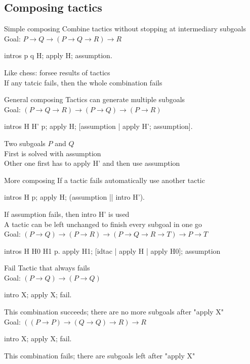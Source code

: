 \subsection{Composing tactics}
\begin{frame}[fragile]{Simple composing}
	Combine tactics without stopping at intermediary subgoals\\
	\pause
	\medskip
	Goal: $P \rightarrow Q \rightarrow (P \rightarrow Q \rightarrow R) \rightarrow R$
	\pause
	\begin{user}
		intros p q H; apply H; assumption.
	\end{user}
	\pause
	Like chess: forsee results of tactics\\
	\pause
	\medskip
	If any tatcic fails, then the whole combination fails
\end{frame}
\begin{frame}[fragile]{General composing}
	Tactics can generate multiple subgoals \\
	\pause
	\medskip
	Goal: $(P \rightarrow Q \rightarrow R) \rightarrow (P \rightarrow Q) \rightarrow (P \rightarrow R)$
	\pause
	\begin{user}
		intros H H' p; apply H; [assumption | apply H'; assumption].
	\end{user}
	\pause
	Two subgoals $P$ and $Q$\\
	\pause
	\medskip
	First is solved with assumption\\
	\pause
	Other one first has to apply H' and then use assumption
\end{frame}
\begin{frame}[fragile]{More composing}
	If a tactic fails automatically use another tactic
	\pause
	\begin{user}
		intros H p; apply H; (assumption || intro H').
	\end{user}
	\pause
	If assumption fails, then intro H' is used\\
	\pause
	\bigskip
	A tactic can be left unchanged to finish every subgoal in one go\\
	\pause
	\smallskip
	Goal: $(P \rightarrow Q) \rightarrow (P \rightarrow R) \rightarrow (P \rightarrow Q \rightarrow R \rightarrow T) \rightarrow P \rightarrow T$
	\pause
	\begin{user}
		intros H H0 H1 p.
		apply H1; [idtac | apply H | apply H0]; assumption
	\end{user}
\end{frame}
\begin{frame}[fragile]{Fail}
	Tactic that always fails \\
	\pause
	\medskip
	Goal: $(P \rightarrow Q) \rightarrow (P \rightarrow Q)$
	\pause
	\begin{user}
		intro X; apply X; fail.
	\end{user}
	\pause
	This combination succeeds; there are no more subgoals after "apply X"\\
	\pause
	\medskip
	Goal: $((P \rightarrow P) \rightarrow (Q \rightarrow Q) \rightarrow R) \rightarrow R$
	\begin{user}
		intro X; apply X; fail.
	\end{user}
	\pause
	This combination fails; there are subgoals left after "apply X"
\end{frame}
